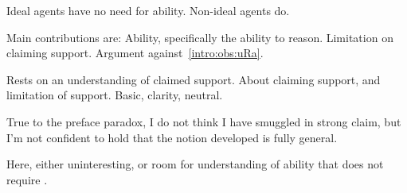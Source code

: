 \begin{note}
  Ideal agents have no need for ability.
  Non-ideal agents do.
\end{note}

\begin{note}
  Main contributions are:
  Ability, specifically the ability to reason.
  Limitation on claiming support.
  Argument against~\ref{intro:obs:uRa}.
\end{note}

\begin{note}
  Rests on an understanding of claimed support.
  About claiming support, and limitation of support.
  Basic, clarity, neutral.

  True to the preface paradox, I do not think I have smuggled in strong claim, but I'm not confident to hold that the notion developed is fully general.

  Here, either uninteresting, or room for understanding of ability that does not require \WR{}.
\end{note}

